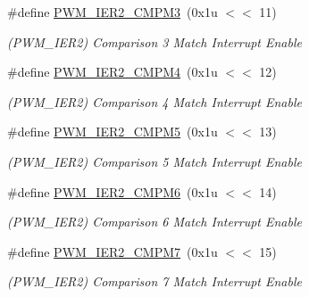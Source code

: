 \begin{DoxyCompactItemize}
\mbox{\label{group__SAMS70__PWM_gaf76789bb910bb6be7e33f80e7ab61478}} 
\#define \mbox{\hyperlink{group__SAMS70__PWM_gaf76789bb910bb6be7e33f80e7ab61478}{P\+W\+M\+\_\+\+I\+E\+R2\+\_\+\+C\+M\+P\+M3}}~(0x1u $<$$<$ 11)
\begin{DoxyCompactList}\small\item\em (P\+W\+M\+\_\+\+I\+E\+R2) Comparison 3 Match Interrupt Enable \end{DoxyCompactList}\item 
\mbox{\label{group__SAMS70__PWM_gad34069cf0d0a952ec93e25ab6e0393f0}} 
\#define \mbox{\hyperlink{group__SAMS70__PWM_gad34069cf0d0a952ec93e25ab6e0393f0}{P\+W\+M\+\_\+\+I\+E\+R2\+\_\+\+C\+M\+P\+M4}}~(0x1u $<$$<$ 12)
\begin{DoxyCompactList}\small\item\em (P\+W\+M\+\_\+\+I\+E\+R2) Comparison 4 Match Interrupt Enable \end{DoxyCompactList}\item 
\mbox{\label{group__SAMS70__PWM_gac85a721c9751d05ea064ca180b45d98a}} 
\#define \mbox{\hyperlink{group__SAMS70__PWM_gac85a721c9751d05ea064ca180b45d98a}{P\+W\+M\+\_\+\+I\+E\+R2\+\_\+\+C\+M\+P\+M5}}~(0x1u $<$$<$ 13)
\begin{DoxyCompactList}\small\item\em (P\+W\+M\+\_\+\+I\+E\+R2) Comparison 5 Match Interrupt Enable \end{DoxyCompactList}\item 
\mbox{\label{group__SAMS70__PWM_ga5a109538ada1094ded88aa1e09d0aca6}} 
\#define \mbox{\hyperlink{group__SAMS70__PWM_ga5a109538ada1094ded88aa1e09d0aca6}{P\+W\+M\+\_\+\+I\+E\+R2\+\_\+\+C\+M\+P\+M6}}~(0x1u $<$$<$ 14)
\begin{DoxyCompactList}\small\item\em (P\+W\+M\+\_\+\+I\+E\+R2) Comparison 6 Match Interrupt Enable \end{DoxyCompactList}\item 
\mbox{\label{group__SAMS70__PWM_gaa9a7c0c83f409e3d87e205bc17d3c5e5}} 
\#define \mbox{\hyperlink{group__SAMS70__PWM_gaa9a7c0c83f409e3d87e205bc17d3c5e5}{P\+W\+M\+\_\+\+I\+E\+R2\+\_\+\+C\+M\+P\+M7}}~(0x1u $<$$<$ 15)
\begin{DoxyCompactList}\small\item\em (P\+W\+M\+\_\+\+I\+E\+R2) Comparison 7 Match Interrupt Enable \end{DoxyCompactList}\item 
$$
\end{DoxyCompactItemize}
